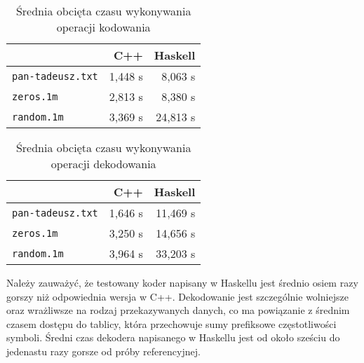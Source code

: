 \documentclass[../../praca.tex]{subfiles}
\begin{document}
\begin{table}[h]
  \centering
  \begin{tabular}{| l | r | r |}
    \hline
    & C++ & Haskell \\ \hline
    \texttt{pan-tadeusz.txt} & 1,448 s & 8,063 s\\ \hline
    \texttt{zeros.1m} & 2,813 s & 8,380 s\\ \hline
    \texttt{random.1m} & 3,369 s & 24,813 s\\ \hline
  \end{tabular}
  \caption{Średnia obcięta czasu wykonywania operacji kodowania}
  \label{tab:encode-time}
\end{table}

\begin{table}[h]
  \centering
  \begin{tabular}{| l | r | r |}
    \hline
    & C++ & Haskell \\ \hline
    \texttt{pan-tadeusz.txt} & 1,646 s & 11,469 s \\ \hline
    \texttt{zeros.1m} & 3,250 s & 14,656 s\\ \hline
    \texttt{random.1m} & 3,964 s & 33,203 s\\ \hline
  \end{tabular}
  \caption{Średnia obcięta czasu wykonywania operacji dekodowania}
  \label{tab:decode-time}
\end{table}

Należy zauważyć, że testowany koder napisany w Haskellu
jest średnio osiem razy gorszy niż odpowiednia wersja w C++.
Dekodowanie jest szczególnie wolniejsze oraz wrażliwsze 
na rodzaj przekazywanych danych, co ma powiązanie z 
średnim czasem dostępu do tablicy, która przechowuje
sumy prefiksowe częstotliwości symboli. Średni czas
dekodera napisanego w Haskellu jest od około sześciu 
do jedenastu razy gorsze od próby referencyjnej.
\end{document}
